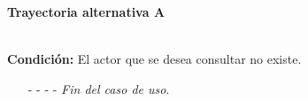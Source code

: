 \hypertarget{CU10-4:TAA}{\textbf{Trayectoria alternativa A}}\\
\noindent \textbf{Condición:} El actor que se desea consultar no existe.
\begin{enumerate}
	\UCpaso[\UCsist] Muestra el mensaje  en la pantalla .
	\item[- -] - - {\em {Fin del caso de uso}}.
\end{enumerate}

	
